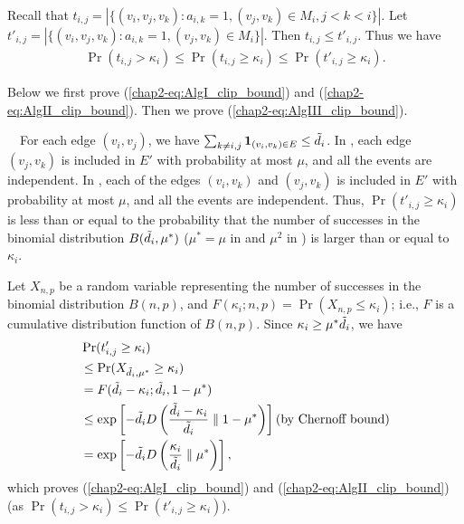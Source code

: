 {Recall that
$t_{i,j} = |\{(v_i,v_j,v_k) : a_{i,k} = 1, (v_j,v_k) \in M_i, j<k<i \}|$.
Let
$t'_{i,j} = |\{(v_i,v_j,v_k) : a_{i,k} = 1, (v_j,v_k) \in M_i \}|$.
Then $t_{i,j} \leq t'_{i,j}$.
Thus we have
\begin{align*}
    \Pr(t_{i,j} > \kappa_i) \leq \Pr(t_{i,j} \geq \kappa_i) \leq \Pr(t'_{i,j} \geq \kappa_i).
\end{align*}

Below we first prove (\ref{chap2-eq:AlgI_clip_bound}) and (\ref{chap2-eq:AlgII_clip_bound}). Then we prove (\ref{chap2-eq:AlgIII_clip_bound}).

\smallskip
{}~~For each edge $(v_i,v_j)$, we have $\sum_{k \ne i,j} \textbf{1}_{(v_i,v_k) \in E} \leq \tilde{d}_i$.
In \AlgOne{}, each edge $(v_j,v_k)$ is included in $E'$ with probability at most $\mu$, and all the events are independent.
In \AlgTwo{}, each of the edges $(v_i,v_k)$ and $(v_j,v_k)$ is included in $E'$ with probability at most $\mu$, and all the events are independent.
Thus, $\Pr(t'_{i,j} \geq \kappa_i)$ is less than or equal to the probability that the number of successes in the binomial distribution $B(\tilde{d}_i, \mu^*)$ ($\mu^* = \mu$ in \AlgOne{} and $\mu^2$ in \AlgTwo{}) is larger than or equal to $\kappa_i$.

Let $X_{n,p}$ be a random variable representing the number of successes in the binomial distribution $B(n,p)$, and $F(\kappa_i;n,p) = \Pr(X_{n,p} \leq \kappa_i)$; i.e., $F$ is a cumulative distribution function of $B(n,p)$.
Since $\kappa_i \geq \mu^* \tilde{d}_i$, we have
\begin{align*}
    &\Pr(t'_{i,j} \geq \kappa_i) \\
    &\leq \Pr(X_{\tilde{d}_i, \mu^*} \geq \kappa_i) \\
    &= F(\tilde{d}_i - \kappa_i; \tilde{d}_i, 1-\mu^*) \\
    &\leq \exp \left[-\tilde{d}_i D \left(\frac{\tilde{d}_i - \kappa_i}{\tilde{d}_i} \parallel 1-\mu^* \right) \right]  \text{(by Chernoff bound)}\\
    &= \exp \left[-\tilde{d}_i D \left(\frac{\kappa_i}{\tilde{d}_i} \parallel \mu^* \right) \right],
\end{align*}
which proves (\ref{chap2-eq:AlgI_clip_bound}) and (\ref{chap2-eq:AlgII_clip_bound}) (as $\Pr(t_{i,j} > \kappa_i) \leq \Pr(t'_{i,j} \geq \kappa_i)$).

}
